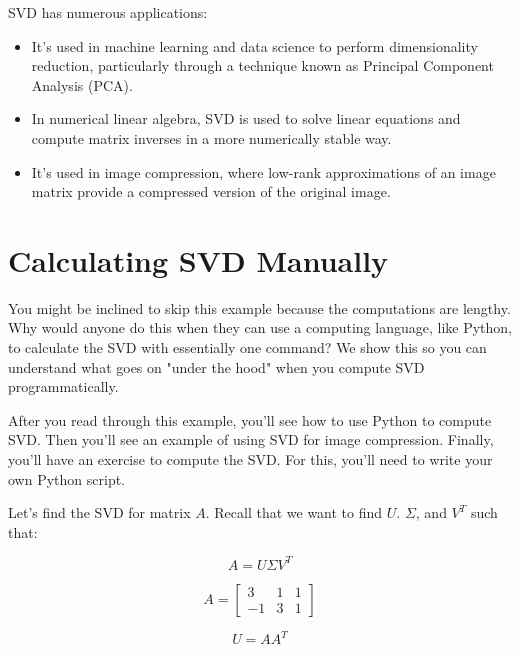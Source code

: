 SVD has numerous applications:
\begin{itemize}
\item It's used in machine learning and data science to perform
  dimensionality reduction, particularly through a technique known as
  Principal Component Analysis (PCA).
\item In numerical linear algebra, SVD is used to solve linear
  equations and compute matrix inverses in a more numerically stable
  way.
\item It's used in image compression, where low-rank approximations of an image matrix provide a compressed version of the original image. 
\end{itemize}

\section{Calculating SVD Manually}
You might be inclined to skip this example because the computations are lengthy. Why would anyone do this when they can use a computing language, like Python, to calculate the SVD with essentially one command? We show this so you can understand what goes on "under the hood" when you compute SVD programmatically. 

After you read through this example, you'll see how to use Python to compute SVD. Then you'll see an example of using SVD for image compression. Finally, you'll have an exercise to compute the SVD. For this, you'll need to write your own Python script.

Let's find the SVD for matrix $A$. Recall that we want to find $U$. $\Sigma$, and $V^T$ such that:

\begin{equation}
A = U \Sigma V^T
\end{equation}

$$ A = \begin{bmatrix}
3 & 1 & 1  \\
 -1 & 3 & 1 
\end{bmatrix}$$

$$U = AA^T$$ 

